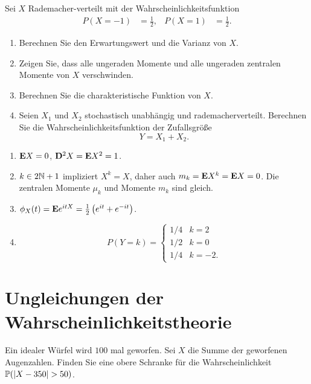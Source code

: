  Sei $X$ Rademacher-verteilt mit der
Wahrscheinlichkeitsfunktion
\begin{align*}
    P(X=-1) &= \frac{1}{2}, & P(X=1)& = \frac{1}{2}.
\end{align*}
\begin{enumerate}
    \item Berechnen Sie den Erwartungswert und die Varianz von $X$. 

    \item Zeigen Sie, dass alle ungeraden Momente und alle ungeraden zentralen
        Momente von $X$ verschwinden. 

    \item Berechnen Sie die charakteristische Funktion von $X$. 

    \item Seien $X_1$ und $X_2$ stochastisch unabhängig und rademacherverteilt.
        Berechnen Sie die Wahrscheinlichkeitsfunktion der Zufallsgröße
        \begin{equation*}
            Y = X_1 + X_2.
        \end{equation*}
\end{enumerate}

\solution
\begin{enumerate}
    \item $\mathbf E X= 0$, $\mathbf D^2 X = \mathbf E X^2 = 1$.
    \item $k\in 2\mathbb N+1$ impliziert $X^k= X$, daher auch $m_{k} = \mathbf E X^k = \mathbf E
        X=0$. Die zentralen Momente $\mu_k$ und Momente $m_{k}$ sind gleich. 
    \item $\phi_{X}(t) = \mathbf E e^{i t X} = \frac{1}{2} \left(  e^{it} + e^{-it} \right)$.
    \item \begin{equation*}
            P(Y=k) =
            \begin{cases}
                1/4 & k=2 \\
                1/2 & k=0 \\
                1/4 & k=-2.
            \end{cases}
        \end{equation*}
\end{enumerate}


\section{Ungleichungen der Wahrscheinlichkeitstheorie}

 Ein idealer Würfel
wird $100$ mal geworfen. Sei $X$ die Summe der geworfenen Augenzahlen. Finden
Sie eine obere Schranke für die Wahrscheinlichkeit $\mathbb P( | X - 350 | > 50)$. 

